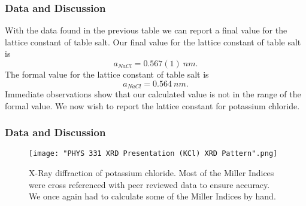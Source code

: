 \documentclass{beamer}
\begin{document}
\begin{frame}
\frametitle{Data and Discussion}
With the data found in the previous table we can report a final value for the lattice constant of table salt. Our final value for the lattice constant of table salt is
\begin{equation}\label{3}
a_{NaCl}=0.567(1) \ nm.
\end{equation}
The formal value for the lattice constant of table salt is \cite{LatticeWiki}
\begin{equation}\label{4}
a_{NaCl}=0.564 \ nm.
\end{equation}
Immediate observations show that our calculated value is not in the range of the formal value. We now wish to report the lattice constant for potassium chloride.
\end{frame}


\begin{frame}
\frametitle{Data and Discussion}
\begin{figure}[htbp]
\begin{center}
\texttt{[image: "PHYS 331 XRD Presentation (KCl) XRD Pattern".png]}
\caption{X-Ray diffraction of potassium chloride. Most of the Miller Indices were cross referenced with peer reviewed data to ensure accuracy. We once again had to calculate some of the Miller Indices by hand.}
\end{center}
\end{figure}
\end{frame}

\end{document}
